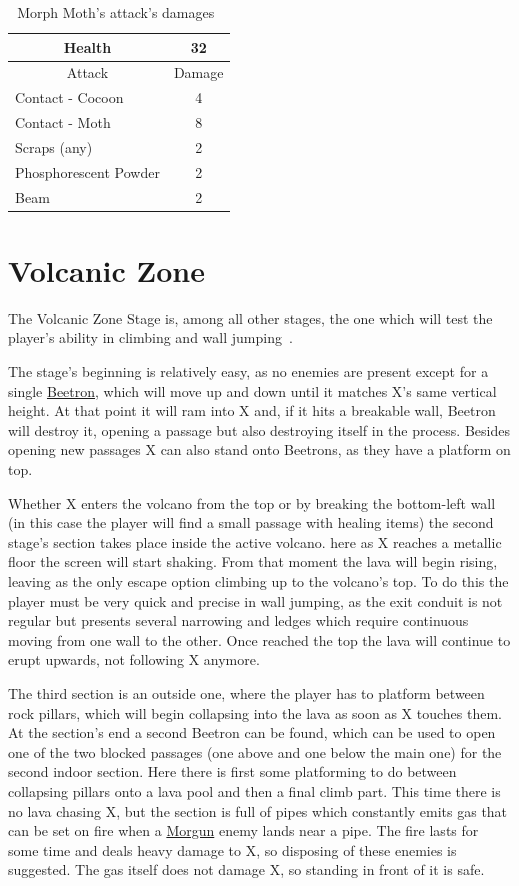\begin{table}[htp]
	\centering
	\begin{tabular}[h]{l c}
		
		\toprule
		\multicolumn{1}{c}{Health}  & 32 \\
		\midrule
		\multicolumn{1}{c}{Attack} & \multicolumn{1}{c}{Damage}\\
		Contact - Cocoon & 4 \\
		Contact - Moth& 8\\
		Scraps (any) & 2\\
		Phosphorescent Powder& 2\\
		Beam & 2\\
		\bottomrule
	\end{tabular}
	\caption{Morph Moth's attack's damages~\cite{wiki:Morph_moth}}
\end{table}

\section{Volcanic Zone}
The Volcanic Zone Stage is, among all other stages, the one which will test the player's ability in climbing and wall jumping~\cite{stratwiki:Volcanic_zone}. 

The stage's beginning is relatively easy, as no enemies are present except for a single \hyperlink{enem:Beetron}{Beetron}, which will move up and down until it matches X’s same vertical height. At that point it will ram into X and, if it hits a breakable wall, Beetron will destroy it, opening a passage but also destroying itself in the process. Besides opening new passages X can also stand onto Beetrons, as they have a platform on top.

Whether X enters the volcano from the top or by breaking the bottom-left wall (in this case the player will find a small passage with healing items) the second stage's section takes place inside the active volcano. here as X reaches a metallic floor the screen will start shaking. From that moment the lava will begin rising, leaving as the only escape option climbing up to the volcano's top. To do this the player must be very quick and precise in wall jumping, as the exit conduit is not regular but presents several narrowing and ledges which require continuous moving from one wall to the other. Once reached the top the lava will continue to erupt upwards, not following X anymore.

The third section is an outside one, where the player has to platform between rock pillars, which will begin collapsing into the lava as soon as X touches them. At the section's end a second Beetron can be found, which can be used to open one of the two blocked passages (one above and one below the main one) for the second indoor section. Here there is first some platforming to do between collapsing pillars onto a lava pool and then a final climb part. This time there is no lava chasing X,  but the section is full of pipes which constantly emits gas that can be set on fire when a \hyperlink{enem:Morgun}{Morgun} enemy lands near a pipe. The fire lasts for some time and deals heavy damage to X, so disposing of these enemies is suggested. The gas itself does not damage X, so standing in front of it is safe.

